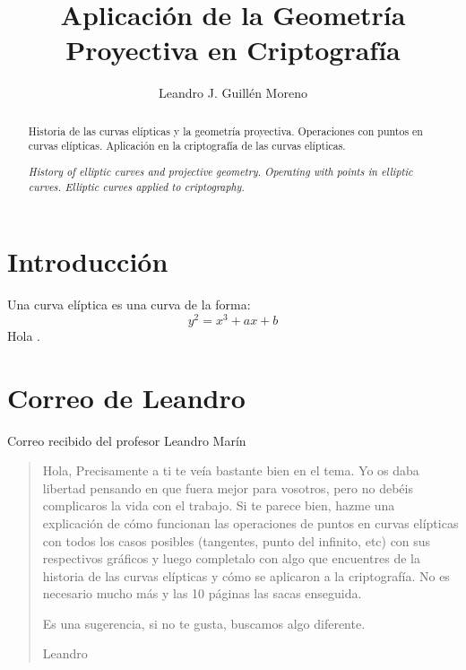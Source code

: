 \documentclass[a4paper,10pt]{article}
\title{Aplicación de la Geometría Proyectiva en Criptografía}
\author{Leandro J. Guillén Moreno}
\begin{document}
\maketitle

\begin{abstract}
Historia de las curvas elípticas y la geometría proyectiva. Operaciones con puntos en curvas elípticas. Aplicación en la criptografía de las curvas elípticas.

\emph{History of elliptic curves and projective geometry. Operating with points in elliptic curves. Elliptic curves applied to criptography.}
\end{abstract}

\section{Introducción}
Una curva elíptica es una curva de la forma: $$y^{2}=x^{3}+ax+b$$
Hola \cite{lamport94}.


\section{Correo de Leandro}
Correo recibido del profesor Leandro Marín

\begin{quotation}
Hola,
Precisamente a ti te veía bastante bien en el tema. Yo os daba libertad pensando en que fuera mejor para vosotros, pero no debéis complicaros la vida con el trabajo. Si te parece bien, hazme una explicación de cómo funcionan las operaciones de puntos en curvas elípticas con todos los casos posibles (tangentes, punto del infinito, etc) con sus respectivos gráficos y luego completalo con algo que encuentres de la historia de las curvas elípticas y cómo se aplicaron a la criptografía. No es necesario mucho más y las 10 páginas las sacas enseguida.

Es una sugerencia, si no te gusta, buscamos algo diferente.

Leandro
\end{quotation}



\end{document}
